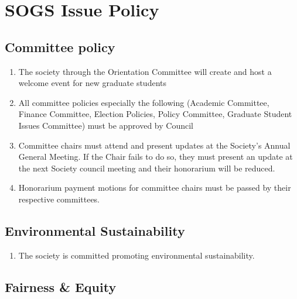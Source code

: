 \section{SOGS Issue Policy}


\subsection{Committee policy}
\begin{enumerate}
\item 	The society through the Orientation Committee will create and host a welcome event for new graduate students 
\item	All committee policies especially the following (Academic Committee, Finance Committee, Election Policies, Policy Committee, Graduate Student Issues Committee) must be approved by Council 
\item	Committee chairs must attend and present updates at the Society's Annual General Meeting. If the Chair fails to do so, they must present an update at the next Society council meeting and their honorarium will be reduced.  
\item	Honorarium payment motions for committee chairs must be passed by their respective committees. 
\end{enumerate}

\subsection{Environmental Sustainability}
\begin{enumerate}
\item The society is committed promoting environmental sustainability. 
\end{enumerate}


\subsection{Fairness \& Equity}

